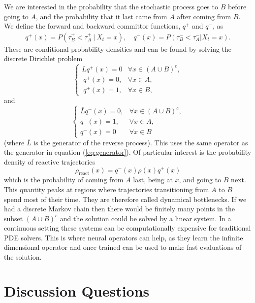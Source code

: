 \documentclass[ 11pt]{article}
\theoremstyle{definition}
\begin{document}
We are interested in the probability that the stochastic process goes to $B$ before going to $A$, and the probability that it last came from $A$ after coming from $B$. We define the forward and backward committor functions, $q^+$ and $q^-$, as
\begin{align*}
  q^+(x) = P(\tau_B^+ < \tau_A^+ \ |\ X_t = x),
 \quad q^-(x) = P(\tau_{B}^- < \tau_{A}^-| X_t = x).
\end{align*} 
These are conditional probability densities and can be found by solving the discrete Dirichlet problem
$$\begin{cases}
   Lq^+(x) = 0 & \forall x \in (A \cup B)^c,  \\
   \ q^+(x) =0, & \forall x \in A, \\
   \ q^+(x)=1, & \forall x \in B,
\end{cases}$$
and
$$\begin{cases}
   \bar Lq^-(x) = 0, & \forall x \in (A\cup B)^c,\\ 
   q^-(x)=1, & \forall x \in A, \\
    q^-(x)=0 & \forall x \in B
\end{cases}$$
(where $\bar L$ is the generator of the reverse process). This uses the same operator as the generator in equation (\ref{eq:generator}).  Of particular
interest is the probability density of reactive trajectories
\begin{equation*}
  \rho_\text{react}(x) = q^-(x)\rho(x)q^+(x)
\end{equation*}
which is the probability of coming from $A$ last, being at $x$, and going to
$B$ next. This quantity peaks at regions where trajectories transitioning
from $A$ to $B$ spend most of their time. They are therefore called
dynamical bottlenecks.
If we had a discrete Markov chain then there would be finitely many points in the subset $(A \cup B)^c$ and the solution could be solved by a linear system. In a continuous setting these systems can be computationally expensive for traditional PDE solvers. This is where neural operators can help, as they learn the infinite dimensional operator and once trained can be used to make fast evaluations of the solution. 

\section{Discussion Questions}
\end{document}
